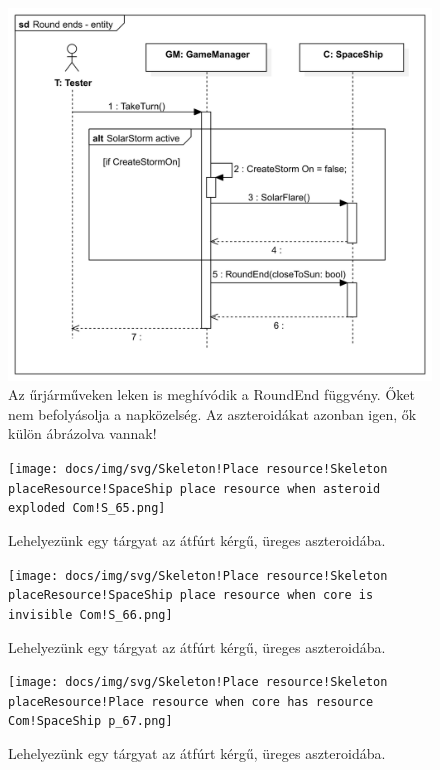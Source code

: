 \begin{figure}[H] 
\centering 
\includegraphics[width=1\textwidth]{docs/img/svg/Skeleton!Move asteroid field!Collaboration2!Sequence!Round ends - entity_39.png} 
\caption{Az űrjárműveken leken is meghívódik a RoundEnd függvény. Őket nem befolyásolja a napközelség.
Az aszteroidákat azonban igen, ők külön ábrázolva vannak!} 
\end{figure} 

\begin{figure}[H] 
\centering 
\texttt{[image: docs/img/svg/Skeleton!Place resource!Skeleton placeResource!SpaceShip place resource when asteroid exploded Com!S\_65.png]} 
\caption{Lehelyezünk egy tárgyat az átfúrt kérgű, üreges aszteroidába.} 
\end{figure} 

\begin{figure}[H] 
\centering 
\texttt{[image: docs/img/svg/Skeleton!Place resource!Skeleton placeResource!SpaceShip place resource when core is invisible Com!S\_66.png]} 
\caption{Lehelyezünk egy tárgyat az átfúrt kérgű, üreges aszteroidába.} 
\end{figure} 

\begin{figure}[H] 
\centering 
\texttt{[image: docs/img/svg/Skeleton!Place resource!Skeleton placeResource!Place resource when core has resource Com!SpaceShip p\_67.png]} 
\caption{Lehelyezünk egy tárgyat az átfúrt kérgű, üreges aszteroidába.} 
\end{figure} 

